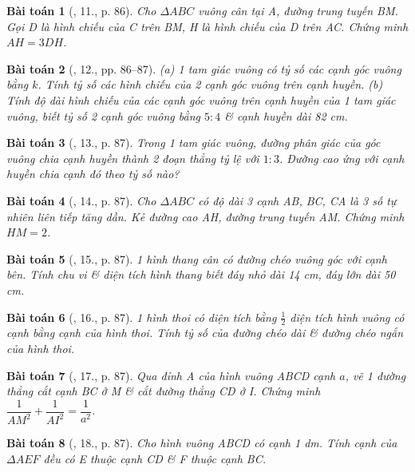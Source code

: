 \documentclass{article}
\newtheorem{baitoan}{Bài toán}
\begin{document}
\begin{baitoan}[\cite{Binh_Toan_9_tap_1}, 11., p. 86]
	Cho $\Delta ABC$ vuông cân tại A, đường trung tuyến BM. Gọi D là hình chiếu của C trên BM, H là hình chiếu của D trên AC. Chứng minh $AH = 3DH$.
\end{baitoan}

\begin{baitoan}[\cite{Binh_Toan_9_tap_1}, 12., pp. 86--87]
	(a) 1 tam giác vuông có tỷ số các cạnh góc vuông bằng $k$. Tính tỷ số các hình chiếu của 2 cạnh góc vuông trên cạnh huyền. (b) Tính độ dài hình chiếu của các cạnh góc vuông trên cạnh huyền của 1 tam giác vuông, biết tỷ số 2 cạnh góc vuông bằng $5:4$ \& cạnh huyền dài {\rm82 cm}.
\end{baitoan}

\begin{baitoan}[\cite{Binh_Toan_9_tap_1}, 13., p. 87]
	Trong 1 tam giác vuông, đường phân giác của góc vuông chia cạnh huyền thành 2 đoạn thẳng tỷ lệ với $1:3$. Đường cao ứng với cạnh huyền chia cạnh đó theo tỷ số nào?
\end{baitoan}

\begin{baitoan}[\cite{Binh_Toan_9_tap_1}, 14., p. 87]
	Cho $\Delta ABC$ có độ dài 3 cạnh AB, BC, CA là 3 số tự nhiên liên tiếp tăng dần. Kẻ đường cao AH, đường trung tuyến AM. Chứng minh $HM = 2$.
\end{baitoan}

\begin{baitoan}[\cite{Binh_Toan_9_tap_1}, 15., p. 87]
	1 hình thang cân có đường chéo vuông góc với cạnh bên. Tính chu vi \& diện tích hình thang biết đáy nhỏ dài {\rm14 cm}, đáy lớn dài {\rm50 cm}.
\end{baitoan}

\begin{baitoan}[\cite{Binh_Toan_9_tap_1}, 16., p. 87]
	1 hình thoi có diện tích bằng $\frac{1}{2}$ diện tích hình vuông có cạnh bằng cạnh của hình thoi. Tính tỷ số của đường chéo dài \& đường chéo ngắn của hình thoi.
\end{baitoan}

\begin{baitoan}[\cite{Binh_Toan_9_tap_1}, 17., p. 87]
	Qua đỉnh A của hình vuông ABCD cạnh $a$, vẽ 1 đường thẳng cắt cạnh BC ở M \& cắt đường thẳng CD ở I. Chứng minh $\dfrac{1}{AM^2} + \dfrac{1}{AI^2} = \dfrac{1}{a^2}$.
\end{baitoan}

\begin{baitoan}[\cite{Binh_Toan_9_tap_1}, 18., p. 87]
	Cho hình vuông ABCD có cạnh {\rm1 dm}. Tính cạnh của $\Delta AEF$ đều có E thuộc cạnh CD \& F thuộc cạnh BC.
\end{baitoan}
\end{document}
